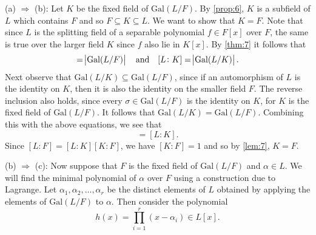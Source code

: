\documentclass[leqno]{article}
\makeatletter
\theoremstyle{definition}
\theoremstyle{remark}
\let\oldproofname=\proofname
\renewcommand{\proofname}{\textit{\oldproofname}}
\theoremstyle{definition}
\renewenvironment{proof}[1][\proofname]{\par
  \pushQED{\qed}%
  \normalfont \topsep6\p@\@plus6\p@\relax
  \list{}{\leftmargin=0mm
          \rightmargin=0mm
          \settowidth{\itemindent}{\itshape#1}%
          \labelwidth=\itemindent
          \parsep=0pt \listparindent=0mm%
  }
  \item[\hskip\labelsep
        \itshape
    #1\@addpunct{.}]\ignorespaces
}{%
  \popQED\endlist\@endpefalse
}
\makeatother
\begin{document}
        \begin{proof}
            (a) $\Rightarrow$ (b): Let $K$ be the fixed field of $\text{Gal}(L/F)$. By \cref{prop:6}, $K$ is a subfield of $L$ which contains $F$ and so $F\subseteq K\subseteq L$. We want to show that $K=F$. Note that since $L$ is the splitting field of a separable polynomial $f\in F[x]$ over $F$, the same is true over the larger field $K$ since $f$ also lie in $K[x]$. By \cref{thm:7} it follows that
                \begin{equation*}
                    [L\colon F]=\abs{\text{Gal}(L/F)}\quad\text{and}\quad[L\colon K]=\abs{\text{Gal}(L/K)}.
                \end{equation*}
            Next observe that $\text{Gal}(L/K)\subseteq\text{Gal}(L/F)$, since if an automorphism of $L$ is the identity on $K$, then it is also the identity on the smaller field $F$. The reverse inclusion also holds, since every $\sigma\in\text{Gal}(L/F)$ is the identity on $K$, for $K$ is the fixed field of $\text{Gal}(L/F)$. It follows that $\text{Gal}(L/K)=\text{Gal}(L/F)$. Combining this with the above equations, we see that 
                \begin{equation*}
                    [L\colon F]=[L\colon K].
                \end{equation*}
            Since $[L\colon F]=[L\colon K][K\colon F]$, we have $[K\colon F]=1$ and so by \cref{lem:7}, $K=F$.\par\hspace{4mm}(b) $\Rightarrow$ (c): Now suppose that $F$ is the fixed field of $\text{Gal}(L/F)$ and $\alpha\in L$. We will find the minimal polynomial of $\alpha$ over $F$ using a construction due to Lagrange. Let $\alpha_1,\alpha_2,\dots,\alpha_r$ be the distinct elements of $L$ obtained by applying the elements of $\text{Gal}(L/F)$ to $\alpha$. Then consider the polynomial
                \begin{equation}
                    h(x)=\prod_{i=1}^r(x-\alpha_i)\in L[x].
                \end{equation}

\end{proof}
\end{document}
